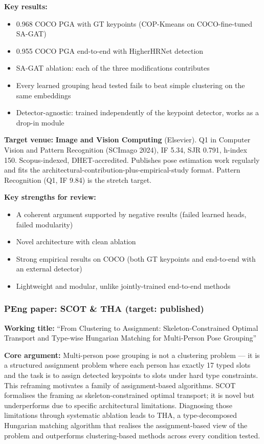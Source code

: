 \textbf{Key results:}
\begin{itemize}
    \item 0.968 COCO PGA with GT keypoints (COP-Kmeans on COCO-fine-tuned SA-GAT)
    \item 0.955 COCO PGA end-to-end with HigherHRNet detection
    \item SA-GAT ablation: each of the three modifications contributes
    \item Every learned grouping head tested fails to beat simple clustering on the same embeddings
    \item Detector-agnostic: trained independently of the keypoint detector, works as a drop-in module
\end{itemize}

\textbf{Target venue:} \textbf{Image and Vision Computing} (Elsevier). Q1 in Computer Vision and Pattern Recognition (SCImago 2024), IF 5.34, SJR 0.791, h-index 150. Scopus-indexed, DHET-accredited. Publishes pose estimation work regularly and fits the architectural-contribution-plus-empirical-study format. Pattern Recognition (Q1, IF 9.84) is the stretch target.

\textbf{Key strengths for review:}
\begin{itemize}
    \item A coherent argument supported by negative results (failed learned heads, failed modularity)
    \item Novel architecture with clean ablation
    \item Strong empirical results on COCO (both GT keypoints and end-to-end with an external detector)
    \item Lightweight and modular, unlike jointly-trained end-to-end methods
\end{itemize}


\subsubsection{PEng paper: SCOT \& THA (target: published)}

\textbf{Working title:} ``From Clustering to Assignment: Skeleton-Constrained Optimal Transport and Type-wise Hungarian Matching for Multi-Person Pose Grouping''

\textbf{Core argument:} Multi-person pose grouping is not a clustering problem --- it is a structured assignment problem where each person has exactly 17 typed slots and the task is to assign detected keypoints to slots under hard type constraints. This reframing motivates a family of assignment-based algorithms. SCOT formalises the framing as skeleton-constrained optimal transport; it is novel but underperforms due to specific architectural limitations. Diagnosing those limitations through systematic ablation leads to THA, a type-decomposed Hungarian matching algorithm that realises the assignment-based view of the problem and outperforms clustering-based methods across every condition tested.

